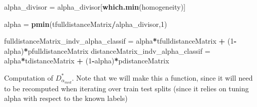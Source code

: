 \documentclass[
]{article}
\newenvironment{Shaded}{\begin{snugshade}}{\end{snugshade}}
\newcommand{\DecValTok}[1]{\textcolor[rgb]{0.00,0.00,0.81}{#1}}
\newcommand{\FunctionTok}[1]{\textcolor[rgb]{0.13,0.29,0.53}{\textbf{#1}}}
\newcommand{\NormalTok}[1]{#1}
\newcommand{\OtherTok}[1]{\textcolor[rgb]{0.56,0.35,0.01}{#1}}
\newcommand{\SpecialCharTok}[1]{\textcolor[rgb]{0.81,0.36,0.00}{\textbf{#1}}}
\begin{document}
\begin{Shaded}
\begin{Highlighting}[]
\NormalTok{alpha\_divisor }\OtherTok{=}\NormalTok{ alpha\_divisor[}\FunctionTok{which.min}\NormalTok{(homogeneity)]}

\NormalTok{alpha }\OtherTok{=} \FunctionTok{pmin}\NormalTok{(tfulldistanceMatrix}\SpecialCharTok{/}\NormalTok{alpha\_divisor,}\DecValTok{1}\NormalTok{)}

\NormalTok{fulldistanceMatrix\_indv\_alpha\_classif }\OtherTok{=}\NormalTok{ alpha}\SpecialCharTok{*}\NormalTok{tfulldistanceMatrix }\SpecialCharTok{+}\NormalTok{ (}\DecValTok{1}\SpecialCharTok{{-}}\NormalTok{alpha)}\SpecialCharTok{*}\NormalTok{pfulldistanceMatrix}
\NormalTok{distanceMatrix\_indv\_alpha\_classif }\OtherTok{=}\NormalTok{ alpha}\SpecialCharTok{*}\NormalTok{tdistanceMatrix }\SpecialCharTok{+}\NormalTok{ (}\DecValTok{1}\SpecialCharTok{{-}}\NormalTok{alpha)}\SpecialCharTok{*}\NormalTok{pdistanceMatrix}
\end{Highlighting}
\end{Shaded}

Computation of \(D_{\alpha_{med}}^*\). Note that we will make this a
function, since it will need to be recomputed when iterating over train
test splits (since it relies on tuning alpha with respect to the known
labels)
\end{document}
